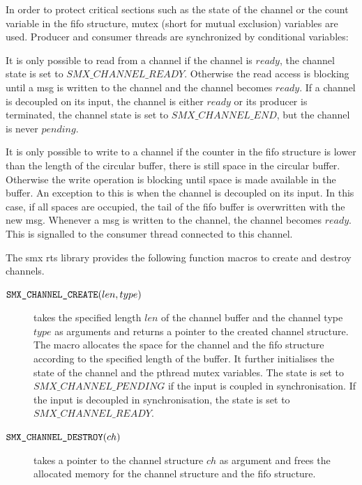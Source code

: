 In order to protect critical sections such as the state of the channel or the count variable in the \gls{fifo} structure, mutex (short for mutual exclusion) variables are used.
Producer and consumer threads are synchronized by conditional variables:

It is only possible to read from a channel if the channel is $ready$, \ie the channel state is set to $\mathit{SMX\_CHANNEL\_READY}$.
Otherwise the read access is blocking until a \gls*{msg} is written to the channel and the channel becomes $ready$.
If a channel is decoupled on its input, the channel is either $ready$ or its producer is terminated, \ie the channel state is set to $\mathit{SMX\_CHANNEL\_END}$, but the channel is never $pending$.

It is only possible to write to a channel if the counter in the \gls{fifo} structure is lower than the length of the circular buffer, \ie there is still space in the circular buffer.
Otherwise the write operation is blocking until space is made available in the buffer.
An exception to this is when the channel is decoupled on its input.
In this case, if all spaces are occupied, the tail of the \gls{fifo} buffer is overwritten with the new \gls*{msg}.
Whenever a \gls*{msg} is written to the channel, the channel becomes $ready$.
This is signalled to the consumer thread connected to this channel.

The \gls*{smx} \gls{rts} library provides the following function macros to create and destroy channels.
\begin{description}
    \item[$\textnormal{\tt SMX\_CHANNEL\_CREATE}(len, type)$] takes the specified length $len$ of the channel buffer and the channel type $type$ as arguments and returns a pointer to the created channel structure.
        The macro allocates the space for the channel and the \gls{fifo} structure according to the specified length of the buffer.
        It further initialises the state of the channel and the pthread mutex variables.
        The state is set to $\mathit{SMX\_CHANNEL\_PENDING}$ if the input is coupled in synchronisation.
        If the input is decoupled in synchronisation, the state is set to $\mathit{SMX\_CHANNEL\_READY}$.
    \item[$\textnormal{\tt SMX\_CHANNEL\_DESTROY}(ch)$] takes a pointer to the channel structure $ch$ as argument and frees the allocated memory for the channel structure and the \gls{fifo} structure.
\end{description}

